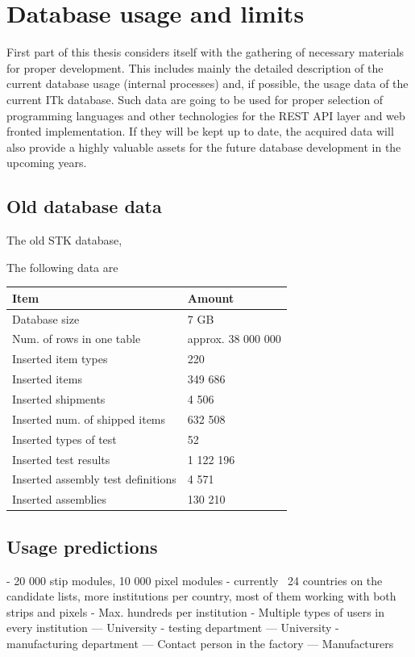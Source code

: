 \section{Database usage and limits}
\label{sec:databaseUsage}
\par First part of this thesis considers itself with the gathering of necessary materials for proper development. This includes mainly the detailed description of the current database usage (internal processes) and, if possible, the usage data of the current ITk database. Such data are going to be used for proper selection of programming languages and other technologies for the REST API layer and web fronted implementation. If they will be kept up to date, the acquired data will also provide a highly valuable assets for the future database development in the upcoming years.


\subsection{Old database data}
\par The old STK database, 

The following data are \cite[slide 4]{cambridgeSctPresentation}
\begin{center}
    \begin{tabular}{ | l | l |}
    \hline
    Item & Amount \\ \hline
	Database size & 7 GB\\ \hline
	Num. of rows in one table & approx. 38 000 000\\ \hline
	Inserted item types & 220 \\ \hline
	Inserted items & 349 686\\ \hline
	Inserted shipments & 4 506\\ \hline
	Inserted num. of shipped items & 632 508 \\ \hline
	Inserted types of test & 52\\ \hline
	Inserted test results & 1 122 196\\ \hline
	Inserted assembly test definitions & 4 571\\ \hline
	Inserted assemblies & 130 210\\ \hline
    \end{tabular}
\end{center}

\subsection{Usage predictions}
- 20 000 stip modules, 10 000 pixel modules
- currently ~24 countries on the candidate lists, more institutions per country, most of them working with both strips and pixels
- Max. hundreds per institution
- Multiple types of users in every institution
— University - testing department
— University - manufacturing department
— Contact person in the factory
— Manufacturers

